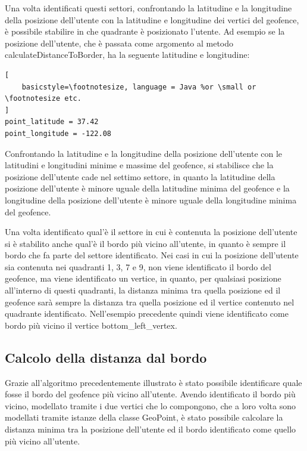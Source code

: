 Una volta identificati questi settori, confrontando la latitudine e la longitudine della posizione dell'utente con la latitudine e longitudine dei vertici del geofence, è possibile stabilire in che quadrante è posizionato l'utente.
Ad esempio se la posizione dell'utente, che è passata come argomento al metodo calculateDistanceToBorder, ha la seguente latitudine e longitudine:
\begin{lstlisting}[
    basicstyle=\footnotesize, language = Java %or \small or \footnotesize etc.
]
point_latitude = 37.42
point_longitude = -122.08
\end{lstlisting}

Confrontando la latitudine e la longitudine della posizione dell'utente con le latitudini e longitudini minime e massime del geofence, si stabilisce che la posizione dell'utente cade nel settimo settore, in quanto la latitudine della posizione dell'utente è minore uguale della latitudine minima del geofence e la longitudine della posizione dell'utente è minore uguale della longitudine minima del geofence.

Una volta identificato qual'è il settore in cui è contenuta la posizione dell'utente si è stabilito anche qual'è il bordo più vicino all'utente, in quanto è sempre il bordo che fa parte del settore identificato.
Nei casi in cui la posizione dell'utente sia contenuta nei quadranti 1, 3, 7 e 9, non viene identificato il bordo del geofence, ma viene identificato un vertice, in quanto, per qualsiasi posizione all'interno di questi quadranti, la distanza minima tra quella posizione ed il geofence sarà sempre la distanza tra quella posizione ed il vertice contenuto nel quadrante identificato. 
Nell'esempio precedente quindi viene identificato come bordo più vicino il vertice bottom\_left\_vertex.

\subsection{Calcolo della distanza dal bordo}
Grazie all'algoritmo precedentemente illustrato è stato possibile identificare quale fosse il bordo del geofence più vicino all'utente. Avendo identificato il bordo più vicino, modellato tramite i due vertici che lo compongono, che a loro volta sono modellati tramite istanze della classe GeoPoint, è stato possibile calcolare la distanza minima tra la posizione dell'utente ed il bordo identificato come quello più vicino all'utente.

